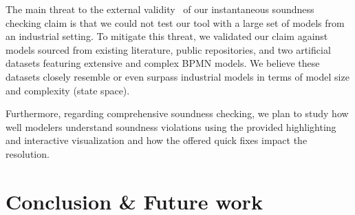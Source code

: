 \documentclass[runningheads]{llncs}
\begin{document}
The main threat to the external validity~\cite{wohlinExperimentationSoftwareEngineering2012} of our instantaneous soundness checking claim is that we could not test our tool with a large set of models from an industrial setting.
To mitigate this threat, we validated our claim against models sourced from existing literature, public repositories, and two artificial datasets featuring extensive and complex BPMN models.
We believe these datasets closely resemble or even surpass industrial models in terms of model size and complexity (state space).

Furthermore, regarding comprehensive soundness checking, we plan to study how well modelers understand soundness violations using the provided highlighting and interactive visualization and how the offered quick fixes impact the resolution.

\section{Conclusion \& Future work}





\end{document}
